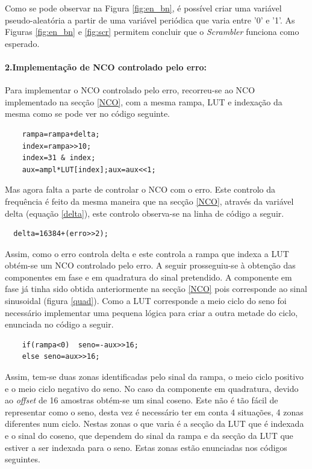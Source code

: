 \documentclass[11pt]{article}
\numberwithin{equation}{section}
\begin{document}
Como se pode observar na Figura \ref{fig:en_bn}, é possível criar uma variável pseudo-aleatória a partir de uma variável periódica que varia entre '0' e '1'. As Figuras \ref{fig:en_bn} e \ref{fig:scr} permitem concluir que o \textit{Scrambler} funciona como esperado.


\paragraph{2.Implementação de NCO controlado pelo erro:} \hspace{0pt} \label{para:P3-2}

Para implementar o NCO controlado pelo erro, recorreu-se ao NCO implementado na secção \ref{NCO}, com a mesma rampa, LUT e indexação da mesma como se pode ver no código seguinte.
\begin{lstlisting}
	rampa=rampa+delta;
	index=rampa>>10;
	index=31 & index;
	aux=ampl*LUT[index];aux=aux<<1;
\end{lstlisting}

Mas agora falta a parte de controlar o NCO com o erro. Este controlo da frequência é feito da mesma maneira que na secção \ref{NCO}, através da variável delta (equação \ref{delta}), este controlo observa-se na linha de código a seguir.
\begin{lstlisting}
  delta=16384+(erro>>2);
\end{lstlisting}

Assim, como o erro controla delta e este controla a rampa que indexa a LUT obtém-se um NCO controlado pelo erro.
A seguir prosseguiu-se à obtenção das componentes em fase e em quadratura do sinal pretendido. A componente em fase já tinha sido obtida anteriormente na secção \ref{NCO} pois corresponde ao sinal sinusoidal (figura \ref{quad}). Como a LUT corresponde a meio ciclo do seno foi necessário implementar uma pequena lógica para criar a outra metade do ciclo, enunciada no código a seguir.
\begin{lstlisting}
	if(rampa<0)  seno=-aux>>16;
	else seno=aux>>16;
\end{lstlisting}

Assim, tem-se duas zonas identificadas pelo sinal da rampa, o meio ciclo positivo e o meio ciclo negativo do seno.
No caso da componente em quadratura, devido ao \textit{offset} de 16 amostras obtém-se um sinal coseno. Este não é tão fácil de representar como o seno, desta vez é necessário ter em conta 4 situações, 4 zonas diferentes num ciclo. Nestas zonas o que varia é a secção da LUT que é indexada e o sinal do coseno, que dependem do sinal da rampa e da secção da LUT que estiver a ser indexada para o seno. Estas zonas estão enunciadas nos códigos seguintes.
\vspace{1mm}
\end{document}
